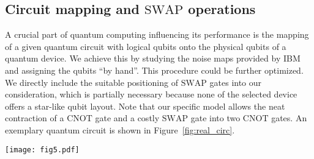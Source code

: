 \documentclass[aps,pra,twocolumn,superscriptaddress,showemail,showpacs,longbibliography]{revtex4-2}
\newcommand{\sigmay}{\operatorname{\sigma_y}}
\newcommand{\sigmaz}{\operatorname{\sigma_z}}
\newcommand{\Op}[1]{\ensuremath{\mathrm{#1}}}
\begin{document}
\subsection{Circuit mapping and \Op{SWAP} operations}
A crucial part of quantum computing influencing its performance is the mapping of a given quantum circuit with logical qubits onto the physical qubits of a quantum device. We achieve this by studying the noise maps provided by IBM and assigning the qubits ``by hand''. This procedure could be further optimized. We directly include the suitable positioning of \Op{SWAP} gates into our consideration, which is partially necessary because none of the selected device offers a star-like qubit layout. Note that our specific model allows the neat contraction of a \Op{CNOT} gate and a costly \Op{SWAP} gate into two \Op{CNOT} gates. An exemplary quantum circuit is shown in Figure~\ref{fig:real_circ}.
\begin{figure*}[ht]
    \centering
    \texttt{[image: fig5.pdf]}
    \caption{Quantum circuit like it was implemented on \texttt{ibmq\_16\_melbourne} as part of a 4-collision experiment on 11/25/2020. Steps: (a) Mapping the logical qubits  onto the device's physical qubits. (b) Rotating the ancillas according to the coupling parameter $g=0.919$. (c) Applying the \Op{CNOT} gates. One \Op{CNOT} is contracted with the necessary \Op{SWAP} operation as highlighted by the dashed box. (d) Alice prepares to realize scenario $x_2$, Bob prepares to measure $\sigmay$. (e) Final $\sigmaz$-measurements.}
    \label{fig:real_circ}
\end{figure*}
\end{document}
